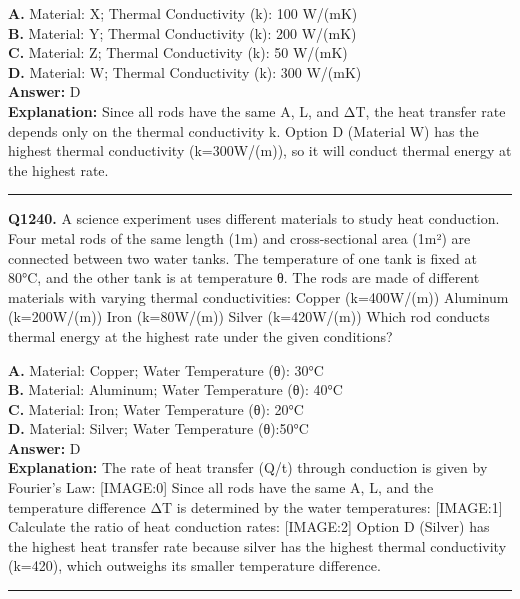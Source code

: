 \documentclass[12pt]{article}
\begin{document}
\textbf{A.} Material: X; Thermal Conductivity (k): 100 W/(m\cdot K) \\
\textbf{B.} Material: Y; Thermal Conductivity (k): 200 W/(m\cdot K) \\
\textbf{C.} Material: Z; Thermal Conductivity (k): 50 W/(m\cdot K) \\
\textbf{D.} Material: W; Thermal Conductivity (k): 300 W/(m\cdot K) \\

\textbf{Answer:} D \\
\textbf{Explanation:} Since all rods have the same A, L, and ΔT, the heat transfer rate depends only on the thermal conductivity k. Option D (Material W) has the highest thermal conductivity (k=300W/(m\cdotpK)), so it will conduct thermal energy at the highest rate.

\hrule
\vspace{1em}


\noindent
\textbf{Q1240.} A science experiment uses different materials to study heat conduction. Four metal rods of the same length (1m) and cross-sectional area (1m²) are connected between two water tanks. The temperature of one tank is fixed at 80°C, and the other tank is at temperature θ. The rods are made of different materials with varying thermal conductivities:
Copper (k=400W/(m\cdotpK))
Aluminum (k=200W/(m\cdotpK))
Iron (k=80W/(m\cdotpK))
Silver (k=420W/(m\cdotpK))
Which rod conducts thermal energy at the highest rate under the given conditions?



\textbf{A.} Material: Copper; Water Temperature (θ): 30°C \\
\textbf{B.} Material: Aluminum; Water Temperature (θ): 40°C \\
\textbf{C.} Material: Iron; Water Temperature (θ): 20°C \\
\textbf{D.} Material: Silver; Water Temperature (θ):50°C \\

\textbf{Answer:} D \\
\textbf{Explanation:} The rate of heat transfer (Q/t) through conduction is given by Fourier's Law:
[IMAGE:0]
Since all rods have the same A, L, and the temperature difference ΔT is determined by the water temperatures:
[IMAGE:1]
Calculate the ratio of heat conduction rates:
[IMAGE:2]
Option D (Silver) has the highest heat transfer rate because silver has the highest thermal conductivity (k=420), which outweighs its smaller temperature difference.

\hrule
\vspace{1em}
\end{document}
